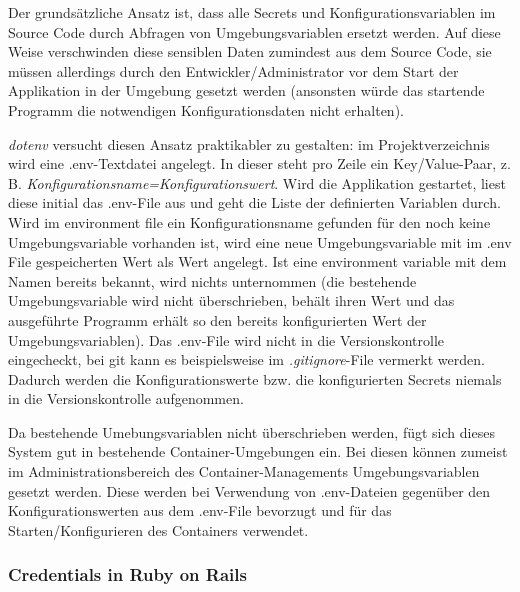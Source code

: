 Der grundsätzliche Ansatz ist, dass alle Secrets und Konfigurationsvariablen im Source Code durch Abfragen von Umgebungsvariablen ersetzt werden. Auf diese Weise verschwinden diese sensiblen Daten zumindest aus dem Source Code, sie müssen allerdings durch den Entwickler/Administrator vor dem Start der Applikation in der Umgebung gesetzt werden (ansonsten würde das startende Programm die notwendigen Konfigurationsdaten nicht erhalten).

\textit{dotenv} versucht diesen Ansatz praktikabler zu gestalten: im Projektverzeichnis wird eine .env-Textdatei angelegt. In dieser steht pro Zeile ein Key/Value-Paar, z. B. \textit{Konfigurationsname=Konfigurationswert}. Wird die Applikation gestartet, liest diese initial das .env-File aus und geht die Liste der definierten Variablen durch. Wird im environment file ein Konfigurationsname gefunden für den noch keine Umgebungsvariable vorhanden ist, wird eine neue Umgebungsvariable mit im .env File gespeicherten Wert als Wert angelegt. Ist eine environment variable mit dem Namen bereits bekannt, wird nichts unternommen (die bestehende Umgebungsvariable wird nicht überschrieben, behält ihren Wert und das ausgeführte Programm erhält so den bereits konfigurierten Wert der Umgebungsvariablen). Das .env-File wird nicht in die Versionskontrolle eingecheckt, bei git kann es beispielsweise im \textit{.gitignore}-File vermerkt werden. Dadurch werden die Konfigurationswerte bzw. die konfigurierten Secrets niemals in die Versionskontrolle aufgenommen.

Da bestehende Umebungsvariablen nicht überschrieben werden, fügt sich dieses System gut in bestehende Container-Umgebungen ein. Bei diesen können zumeist im Administrationsbereich des Container-Managements Umgebungsvariablen gesetzt werden. Diese werden bei Verwendung von .env-Dateien gegenüber den Konfigurationswerten aus dem .env-File bevorzugt und für das Starten/Konfigurieren des Containers verwendet.

\subsubsection{Credentials in Ruby on Rails}

